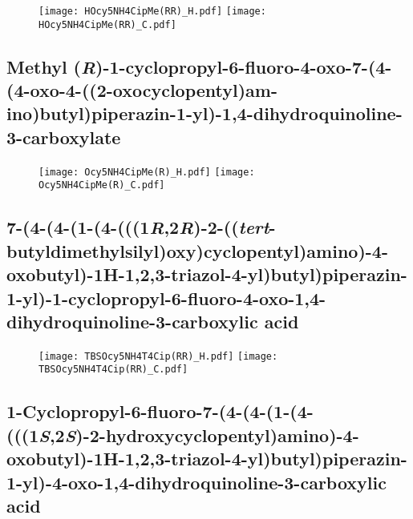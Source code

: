 \begin{figure}[H]
	\centering
		\texttt{[image: HOcy5NH4CipMe(RR)\_H.pdf]}
		\texttt{[image: HOcy5NH4CipMe(RR)\_C.pdf]}
\end{figure}

\subsection{Methyl (\textit{R})\hyp{}1\hyp{}cyclopropyl\hyp{}6\hyp{}fluoro\hyp{}4\hyp{}oxo\hyp{}7\hyp{}(4\hyp{}(4\hyp{}oxo\hyp{}4\hyp{}((2\hyp{}oxocyclopentyl)am\hyp{}ino)butyl)piperazin\hyp{}1\hyp{}yl)\hyp{}1,4\hyp{}dihydroquinoline\hyp{}3\hyp{}carboxylate }

\begin{figure}[H]
	\centering
		\texttt{[image: Ocy5NH4CipMe(R)\_H.pdf]}
		\texttt{[image: Ocy5NH4CipMe(R)\_C.pdf]}
\end{figure}

\subsection{7\hyp{}(4\hyp{}(4\hyp{}(1\hyp{}(4\hyp{}(((1\textit{R},2\textit{R})\hyp{}2\hyp{}((\textit{tert}\hyp{}butyldimethylsilyl)oxy)cyclopentyl)amino)\hyp{}4\hyp{}oxobutyl)\hyp{}1H\hyp{}1,2,3\hyp{}triazol\hyp{}4\hyp{}yl)butyl)piperazin\hyp{}1\hyp{}yl)\hyp{}1\hyp{}cyclopropyl\hyp{}6\hyp{}fluoro\hyp{}4\hyp{}oxo\hyp{}1,4\hyp{}dihydroquinoline\hyp{}3\hyp{}carboxylic acid }

\begin{figure}[H]
	\centering
		\texttt{[image: TBSOcy5NH4T4Cip(RR)\_H.pdf]}
		\texttt{[image: TBSOcy5NH4T4Cip(RR)\_C.pdf]}
\end{figure}

\subsection{1\hyp{}Cyclopropyl\hyp{}6\hyp{}fluoro\hyp{}7\hyp{}(4\hyp{}(4\hyp{}(1\hyp{}(4\hyp{}(((1\textit{S},2\textit{S})\hyp{}2\hyp{}hydroxycyclopentyl)amino)\hyp{}4\hyp{}oxobutyl)\hyp{}1H\hyp{}1,2,3\hyp{}triazol\hyp{}4\hyp{}yl)butyl)piperazin\hyp{}1\hyp{}yl)\hyp{}4\hyp{}oxo\hyp{}1,4\hyp{}dihydroquinoline\hyp{}3\hyp{}carboxylic acid }

